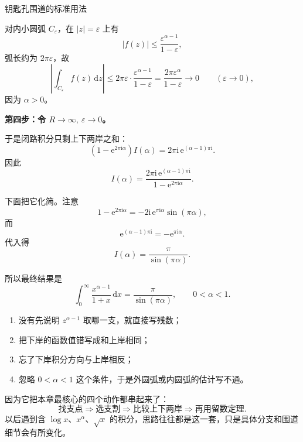 \begin{lizi}{钥匙孔围道的标准用法}{}
\begin{jie}
对内小圆弧 $C_\varepsilon$，在 $|z|=\varepsilon$ 上有
\[
    |f(z)|
    \le
    \frac{\varepsilon^{\alpha-1}}{1-\varepsilon},
\]
弧长约为 $2\pi\varepsilon$，故
\[
    \left|\int_{C_\varepsilon} f(z)\,\mathrm{d}z\right|
    \le
    2\pi\varepsilon \cdot \frac{\varepsilon^{\alpha-1}}{1-\varepsilon}
    =
    \frac{2\pi\varepsilon^\alpha}{1-\varepsilon}
    \to 0
    \qquad (\varepsilon\to 0),
\]
因为 $\alpha>0$。

\textbf{第四步：令 $R\to\infty,\ \varepsilon\to 0$。}

于是闭路积分只剩上下两岸之和：
\[
    \left(1-\mathrm{e}^{2\pi\mathrm{i}\alpha}\right)I(\alpha)
    =
    2\pi\mathrm{i}\,\mathrm{e}^{(\alpha-1)\pi\mathrm{i}}.
\]
因此
\[
    I(\alpha)
    =
    \frac{2\pi\mathrm{i}\,\mathrm{e}^{(\alpha-1)\pi\mathrm{i}}}
    {1-\mathrm{e}^{2\pi\mathrm{i}\alpha}}.
\]

下面把它化简。注意
\[
    1-\mathrm{e}^{2\pi\mathrm{i}\alpha}
    =
    -2\mathrm{i}\,\mathrm{e}^{\pi\mathrm{i}\alpha}\sin(\pi\alpha),
\]
而
\[
    \mathrm{e}^{(\alpha-1)\pi\mathrm{i}}
    =
    -\mathrm{e}^{\pi\mathrm{i}\alpha}.
\]
代入得
\[
    I(\alpha)=\frac{\pi}{\sin(\pi\alpha)}.
\]

所以最终结果是
\[
    \boxed{
        \int_0^\infty \frac{x^{\alpha-1}}{1+x}\,\mathrm{d}x
        =
        \frac{\pi}{\sin(\pi\alpha)},
        \qquad 0<\alpha<1.
    }
\]
\end{jie}
\end{lizi}

\begin{jinshi}[这一题最容易错在哪]
\begin{enumerate}
    \item 没有先说明 $z^{\alpha-1}$ 取哪一支，就直接写残数；
    \item 把下岸的函数值错写成和上岸相同；
    \item 忘了下岸积分方向与上岸相反；
    \item 忽略 $0<\alpha<1$ 这个条件，于是外圆弧或内圆弧的估计写不通。
\end{enumerate}
\end{jinshi}

\begin{tishi}[为什么这道题是本章最典型的代表题]
因为它把本章最核心的四个动作都串起来了：
\[
    \text{找支点} \Longrightarrow \text{选支割} \Longrightarrow \text{比较上下两岸} \Longrightarrow \text{再用留数定理}.
\]
以后遇到含 $\log x$、$x^\alpha$、$\sqrt{x}$ 的积分，思路往往都是这一套，只是具体分支和围道细节会有所变化。
\end{tishi}

